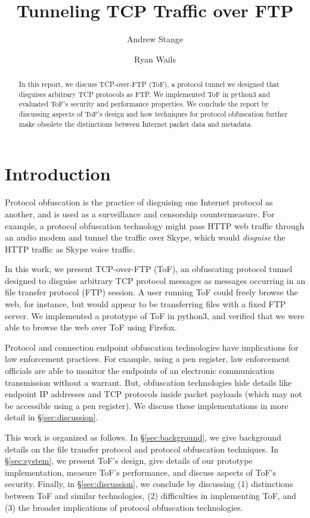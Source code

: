\documentclass[letterpaper,twocolumn,11pt]{article}
\title{Tunneling TCP Traffic over FTP}
\author{Andrew Stange \and Ryan Wails}
\begin{document}
\maketitle

\begin{abstract}
  In this report, we discuss TCP-over-FTP (ToF), a protocol tunnel we designed
  that disguises arbitrary TCP protocols as FTP. We implemented ToF in python3
  and evaluated ToF's security and performance properties. We conclude the
  report by discussing aspects of ToF's design and how techniques for protocol
  obfuscation further make obsolete the distinctions between Internet packet
  data and metadata.
\end{abstract}

\section{Introduction}

Protocol obfuscation is the practice of disguising one Internet protocol as
another, and is used as a surveillance and censorship countermeasure. For
example, a protocol obfuscation technology might pass HTTP web traffic through
an audio modem and tunnel the traffic over Skype, which would \emph{disguise}
the HTTP traffic as Skype voice traffic.

In this work, we present TCP-over-FTP (ToF), an obfuscating protocol tunnel designed
to disguise arbitrary TCP protocol messages as messages occurring in an file
transfer protocol (FTP) session. A user running ToF could freely browse the
web, for instance, but would appear to be transferring files with a fixed FTP
server. We implemented a prototype of ToF in python3, and verified that we were
able to browse the web over ToF using Firefox.

Protocol and connection endpoint obfuscation technologies have implications for
law enforcement practices. For example, using a pen register, law enforcement
officials are able to monitor the endpoints of an electronic communication
transmission without a warrant. But, obfuscation technologies hide details like
endpoint IP addresses and TCP protocols inside packet payloads (which may not
be accessible using a pen register). We discuss these implementations in more
detail in \S\ref{sec:discussion}.

This work is organized as follows. In \S\ref{sec:background}, we give
background details on the file transfer protocol and protocol obfuscation
techniques. In \S\ref{sec:system}, we present ToF's design, give details of our
prototype implementation, measure ToF's performance, and discuss aspects of
ToF's security. Finally, in \S\ref{sec:discussion}, we conclude by discussing
(1) distinctions between ToF and similar technologies, (2) difficulties in
implementing ToF, and (3) the broader implications of protocol obfuscation
technologies.
\end{document}
